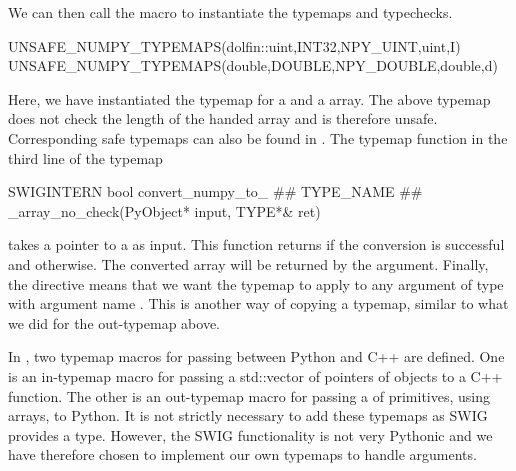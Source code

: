 We can then call the macro to instantiate the typemaps and typechecks.
\begin{swigcode}
UNSAFE_NUMPY_TYPEMAPS(dolfin::uint,INT32,NPY_UINT,uint,I)
UNSAFE_NUMPY_TYPEMAPS(double,DOUBLE,NPY_DOUBLE,double,d)
\end{swigcode}
Here, we have instantiated the typemap for a  and a
 array. The above typemap does not check the length of the handed \numpy array 
and is therefore unsafe. Corresponding safe typemaps can also be found in
. 
The typemap function in the third line of the typemap
\begin{swigcode}
  SWIGINTERN bool convert_numpy_to_ ## TYPE_NAME ## _array_no_check(PyObject* input, TYPE*& ret)
\end{swigcode}
takes a pointer to a  as input. This function returns
 if the conversion is successful and  otherwise. The
converted array will be returned by the  argument. 
Finally, the  directive means that we want the typemap to apply to any argument of type  with argument name . This is another way of copying a typemap, similar to what we did for the  out-typemap above.

In , two typemap macros for passing
 between Python and C++ are defined. One is an
in-typemap macro for passing a std::vector of pointers of \dolfin objects
to a C++ function. The other is an out-typemap macro for passing a
 of primitives, using \numpy arrays, to Python. It is not
strictly necessary to add these typemaps as SWIG provides a
 type. However, the SWIG  functionality
is not very Pythonic and we have therefore chosen to implement our own typemaps to handle  arguments.

